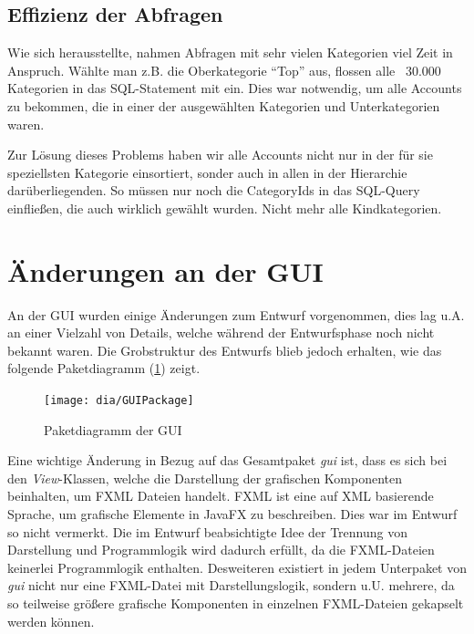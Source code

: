 \subsection{Effizienz der Abfragen}
Wie sich herausstellte, nahmen Abfragen mit sehr vielen Kategorien viel Zeit in Anspruch. Wählte man z.B. die Oberkategorie "`Top"' aus, flossen alle ~30.000 Kategorien in das SQL-Statement mit ein. Dies war notwendig, um alle Accounts zu bekommen, die in einer der ausgewählten Kategorien und Unterkategorien waren.

Zur Lösung dieses Problems haben wir alle Accounts nicht nur in der für sie speziellsten Kategorie einsortiert, sonder auch in allen in der Hierarchie darüberliegenden. So müssen nur noch die CategoryIds in das SQL-Query einfließen, die auch wirklich gewählt wurden. Nicht mehr alle Kindkategorien.

\section{Änderungen an der GUI}
An der GUI wurden einige Änderungen zum Entwurf vorgenommen, dies lag u.A. an einer Vielzahl von Details, welche während der Entwurfsphase noch nicht bekannt waren. 
Die Grobstruktur des Entwurfs blieb jedoch erhalten, wie das folgende Paketdiagramm (\ref{fig:GUI}) zeigt.
\begin{figure}[H]
	\centering
	\texttt{[image: dia/GUIPackage]}
	\caption{Paketdiagramm der GUI}
	\label{fig:GUI}
\end{figure}

Eine wichtige Änderung in Bezug auf das Gesamtpaket \emph{gui} ist, dass es sich bei den \emph{View}-Klassen, welche die Darstellung der grafischen Komponenten beinhalten, um FXML Dateien handelt. FXML ist eine auf XML basierende Sprache, um grafische Elemente in JavaFX zu beschreiben. Dies war im Entwurf so nicht vermerkt. Die im Entwurf beabsichtigte Idee der Trennung von Darstellung und Programmlogik wird dadurch erfüllt, da die FXML-Dateien keinerlei Programmlogik enthalten. Desweiteren existiert in jedem Unterpaket von \emph{gui} nicht nur eine FXML-Datei mit Darstellungslogik, sondern u.U. mehrere, da so teilweise größere grafische Komponenten in einzelnen FXML-Dateien gekapselt werden können.

